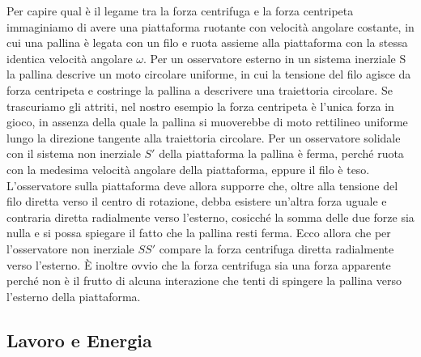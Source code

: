 \documentclass[a4paper,12pt, oneside]{book}
\begin{document}
Per capire qual è il legame tra la forza centrifuga e la forza centripeta immaginiamo di avere una piattaforma ruotante con velocità angolare costante, in cui una pallina è legata con un filo e ruota assieme alla piattaforma con la stessa identica velocità angolare $\omega$. Per un osservatore esterno in un sistema inerziale S la pallina descrive un moto circolare uniforme, in cui la tensione del filo agisce da forza centripeta e costringe la pallina a descrivere una traiettoria circolare. Se trascuriamo gli attriti, nel nostro esempio la forza centripeta è l'unica forza in gioco, in assenza della quale la pallina si muoverebbe di moto rettilineo uniforme lungo la direzione tangente alla traiettoria circolare. Per un osservatore solidale con il sistema non inerziale $S'$ della piattaforma la pallina è ferma, perché ruota con la medesima velocità angolare della piattaforma, eppure il filo è teso. L'osservatore sulla piattaforma deve allora supporre che, oltre alla tensione del filo diretta verso il centro di rotazione, debba esistere un'altra forza uguale e contraria diretta radialmente verso l'esterno, cosicché la somma delle due forze sia nulla e si possa spiegare il fatto che la pallina resti ferma. Ecco allora che per l'osservatore non inerziale $SS'$ compare la forza centrifuga diretta radialmente verso l'esterno. È inoltre ovvio che la forza centrifuga sia una forza apparente perché non è il frutto di alcuna interazione che tenti di spingere la pallina verso l'esterno della piattaforma.

\subsection{Lavoro e Energia}
\end{document}
